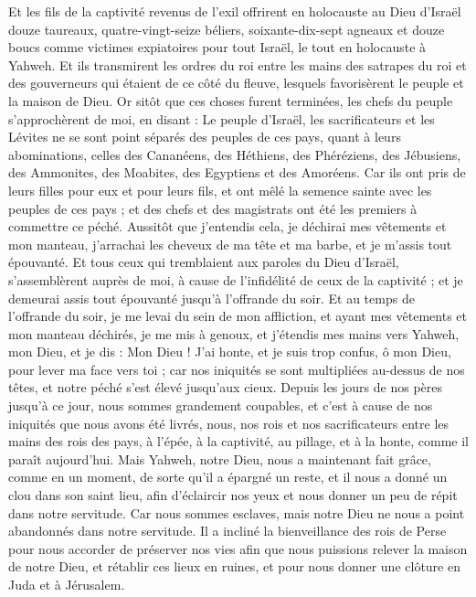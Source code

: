 \begin{multicols}{2}
Et les fils de la captivité revenus de l'exil offrirent en holocauste au Dieu d'Israël douze taureaux, quatre-vingt-seize béliers, soixante-dix-sept agneaux et douze boucs comme victimes expiatoires pour tout Israël, le tout en holocauste à Yahweh.
Et ils transmirent les ordres du roi entre les mains des satrapes du roi et des gouverneurs qui étaient de ce côté du fleuve, lesquels favorisèrent le peuple et la maison de Dieu.
\VerseOne{}Or sitôt que ces choses furent terminées, les chefs du peuple s'approchèrent de moi, en disant : Le peuple d'Israël, les sacrificateurs et les Lévites ne se sont point séparés des peuples de ces pays, quant à leurs abominations, celles des Cananéens, des Héthiens, des Phéréziens, des Jébusiens, des Ammonites, des Moabites, des Egyptiens et des Amoréens.
Car ils ont pris de leurs filles pour eux et pour leurs fils, et ont mêlé la semence sainte avec les peuples de ces pays ; et des chefs et des magistrats ont été les premiers à commettre ce péché.
Aussitôt que j'entendis cela, je déchirai mes vêtements et mon manteau, j'arrachai les cheveux de ma tête et ma barbe, et je m'assis tout épouvanté.
Et tous ceux qui tremblaient aux paroles du Dieu d'Israël, s'assemblèrent auprès de moi, à cause de l'infidélité de ceux de la captivité ; et je demeurai assis tout épouvanté jusqu'à l'offrande du soir.
Et au temps de l'offrande du soir, je me levai du sein de mon affliction, et ayant mes vêtements et mon manteau déchirés, je me mis à genoux, et j'étendis mes mains vers Yahweh, mon Dieu,
et je dis : Mon Dieu ! J'ai honte, et je suis trop confus, ô mon Dieu, pour lever ma face vers toi ; car nos iniquités se sont multipliées au-dessus de nos têtes, et notre péché s'est élevé jusqu'aux cieux.
Depuis les jours de nos pères jusqu'à ce jour, nous sommes grandement coupables, et c'est à cause de nos iniquités que nous avons été livrés, nous, nos rois et nos sacrificateurs entre les mains des rois des pays, à l'épée, à la captivité, au pillage, et à la honte, comme il paraît aujourd'hui.
Mais Yahweh, notre Dieu, nous a maintenant fait grâce, comme en un moment, de sorte qu'il a épargné un reste, et il nous a donné un clou dans son saint lieu, afin d'éclaircir nos yeux et nous donner un peu de répit dans notre servitude.
Car nous sommes esclaves, mais notre Dieu ne nous a point abandonnés dans notre servitude. Il a incliné la bienveillance des rois de Perse pour nous accorder de préserver nos vies afin que nous puissions relever la maison de notre Dieu, et rétablir ces lieux en ruines, et pour nous donner une clôture en Juda et à Jérusalem.

\end{multicols}
